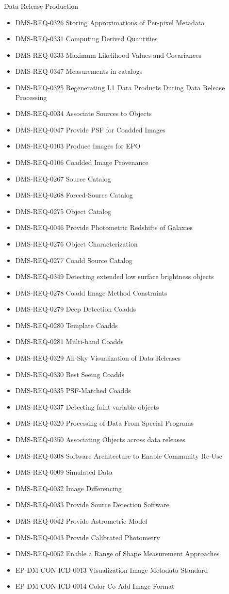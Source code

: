 Data Release Production \begin{itemize}
\item DMS-REQ-0326 Storing Approximations of Per-pixel Metadata
\item DMS-REQ-0331 Computing Derived Quantities
\item DMS-REQ-0333 Maximum Likelihood Values and Covariances
\item DMS-REQ-0347 Measurements in catalogs
\item DMS-REQ-0325 Regenerating L1 Data Products During Data Release Processing
\item DMS-REQ-0034 Associate Sources to Objects
\item DMS-REQ-0047 Provide PSF for Coadded Images
\item DMS-REQ-0103 Produce Images for EPO
\item DMS-REQ-0106 Coadded Image Provenance
\item DMS-REQ-0267 Source Catalog
\item DMS-REQ-0268 Forced-Source Catalog
\item DMS-REQ-0275 Object Catalog
\item DMS-REQ-0046 Provide Photometric Redshifts of Galaxies
\item DMS-REQ-0276 Object Characterization
\item DMS-REQ-0277 Coadd Source Catalog
\item DMS-REQ-0349 Detecting extended  low surface brightness objects
\item DMS-REQ-0278 Coadd Image Method Constraints
\item DMS-REQ-0279 Deep Detection Coadds
\item DMS-REQ-0280 Template Coadds
\item DMS-REQ-0281 Multi-band Coadds
\item DMS-REQ-0329 All-Sky Visualization of Data Releases
\item DMS-REQ-0330 Best Seeing Coadds
\item DMS-REQ-0335 PSF-Matched Coadds
\item DMS-REQ-0337 Detecting faint variable objects
\item DMS-REQ-0320 Processing of Data From Special Programs
\item DMS-REQ-0350 Associating Objects across data releases
\item DMS-REQ-0308 Software Architecture to Enable Community Re-Use
\item DMS-REQ-0009 Simulated Data
\item DMS-REQ-0032 Image Differencing
\item DMS-REQ-0033 Provide Source Detection Software
\item DMS-REQ-0042 Provide Astrometric Model
\item DMS-REQ-0043 Provide Calibrated Photometry
\item DMS-REQ-0052 Enable a Range of Shape Measurement Approaches
\item EP-DM-CON-ICD-0013 Visualization Image Metadata Standard
\item EP-DM-CON-ICD-0014 Color Co-Add Image Format
\end{itemize}

